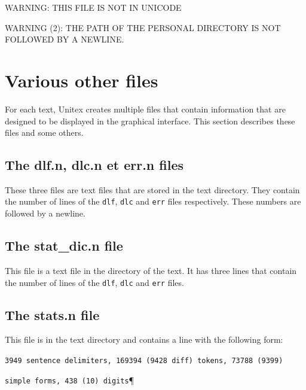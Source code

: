 \bigskip
\noindent WARNING:  THIS FILE IS NOT IN UNICODE

\bigskip
\noindent WARNING (2): THE PATH OF THE PERSONAL
DIRECTORY IS NOT FOLLOWED BY A NEWLINE.

\section{Various other files}
For each text, Unitex creates multiple files that contain information that are
designed to be displayed in the graphical interface. This section describes these
files and some others.


\subsection{The dlf.n, dlc.n et err.n files}
These three files are text files that are stored in the text directory. They
contain the number of lines of the \verb+dlf+, \verb+dlc+ and \verb+err+ files
respectively. These numbers are followed by a newline.


\subsection{The stat\_dic.n file}
This file is a text file in the directory of the text. It has three lines that
contain the number of lines of the \verb+dlf+, \verb+dlc+ and \verb+err+ files.

\subsection{The stats.n file}
This file is in the text directory and contains a line with the following form:


\bigskip
\verb$3949 sentence delimiters, 169394 (9428 diff) tokens, 73788 (9399)$

\verb$simple forms, 438 (10) digits$\P

